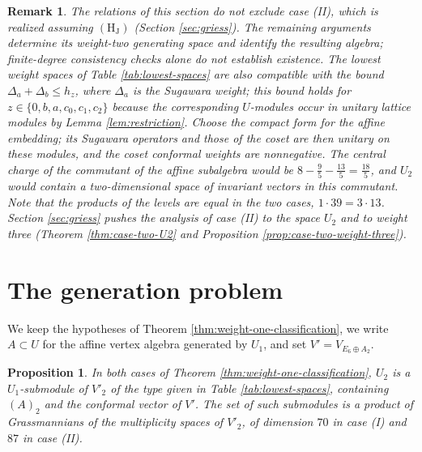 \documentclass[leqno]{article}
\renewcommand{\leq}{\ensuremath{\leqslant}}
\newtheorem{prop}[thm]{Proposition}
\newtheorem{remark}[thm]{Remark}
\numberwithin{equation}{section}
\begin{document}
\begin{remark}\normalfont
\label{rem:case-two}
The relations of this section do not exclude case (II), which is realized assuming $\mathrm{(H_J)}$ (Section \ref{sec:griess}). The remaining arguments determine its weight-two generating space and identify the resulting algebra; finite-degree consistency checks alone do not establish existence. The lowest weight spaces of Table \ref{tab:lowest-spaces} are also compatible with the bound $\Delta_a+\Delta_b \leq h_z$, where $\Delta_a$ is the Sugawara weight; this bound holds for $z \in \{0,b,a,\allowbreak c_0,c_1,c_2\}$ because the corresponding $U$-modules occur in unitary lattice modules by Lemma \ref{lem:restriction}. Choose the compact form for the affine embedding; its Sugawara operators and those of the coset are then unitary on these modules, and the coset conformal weights are nonnegative. The central charge of the commutant of the affine subalgebra would be $8-\frac95-\frac{13}{5} = \frac{18}{5}$, and $U_2$ would contain a two-dimensional space of invariant vectors in this commutant. Note that the products of the levels are equal in the two cases, $1 \cdot 39 = 3 \cdot 13$. Section \ref{sec:griess} pushes the analysis of case (II) to the space $U_2$ and to weight three (Theorem \ref{thm:case-two-U2} and Proposition \ref{prop:case-two-weight-three}).
\end{remark}

\section{The generation problem}
\label{sec:uniqueness}

We keep the hypotheses of Theorem \ref{thm:weight-one-classification}, we write $A \subset U$ for the affine vertex algebra generated by $U_1$, and set $V' = V_{E_6 \oplus A_2}$.

\begin{prop}
\label{prop:u2-moduli}
In both cases of Theorem \ref{thm:weight-one-classification}, $U_2$ is a $U_1$-submodule of $V'_2$ of the type given in Table \ref{tab:lowest-spaces}, containing $(A)_2$ and the conformal vector of $V'$. The set of such submodules is a product of Grassmannians of the multiplicity spaces of $V'_2$, of dimension $70$ in case (I) and $87$ in case (II).
\end{prop}
\end{document}
